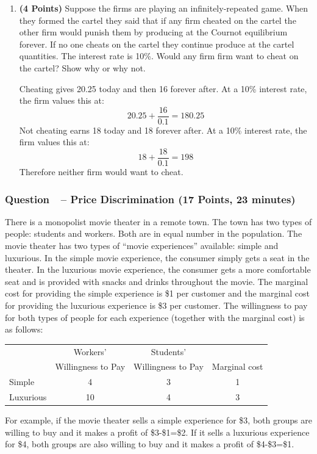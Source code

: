 \documentclass[11pt]{article}
\newcounter{question}[section]
\newcommand{\question}[1]{\refstepcounter{question}
  \subsubsection*{Question~\thequestion~-- #1}}
\newenvironment{subquestions}{
  \begin{enumerate}[label=(\roman*)]}{\end{enumerate}}
\begin{document}
\begin{subquestions}
    \textcolor{solution-color}{
      If firm 2 is producing $q_2=3$, if firm 1 wants to cheat it will produce on its reaction function: $q_1=6-\frac{1}{2}q_2=6-\frac{1}{2}\times3=4.5$.
      If it does this the new price is $p=12-4.5-3=4.5$. Therefore profits are $4.5\times 4.5 = 20.25$.
    }
  \item \textbf{(4 Points)} Suppose the firms are playing an infinitely-repeated game. When they formed the cartel they said that if any firm cheated on the cartel the other firm would punish them by producing at the Cournot equilibrium forever. If no one cheats on the cartel they continue produce at the cartel quantities. The interest rate is 10\%. Would any firm firm want to cheat on the cartel? Show why or why not.

    \textcolor{solution-color}{
      Cheating gives 20.25 today and then 16 forever after. At a 10\% interest rate, the firm values this at:
      \[
        20.25 + \frac{16}{0.1}=180.25
      \]
      Not cheating earns 18 today and 18 forever after. At a 10\% interest rate, the firm values this at:
      \[
        18+\frac{18}{0.1}=198
      \]
      Therefore neither firm would want to cheat.
    }
\end{subquestions}

\question{Price Discrimination (17 Points, 23 minutes)}
There is a monopolist movie theater in a remote town. The town has two types of people: students and workers. Both are in equal number in the population. The movie theater has two types of ``movie experiences'' available: simple and luxurious. In the simple movie experience, the consumer simply gets a seat in the theater. In the luxurious movie experience, the consumer gets a more comfortable seat and is provided with snacks and drinks throughout the movie. The marginal cost for providing the simple experience is \$1 per customer and the marginal cost for providing the luxurious experience is \$3 per customer. The willingness to pay for both types of people for each experience (together with the marginal cost) is as follows:

\begin{center}
  \begin{tabular}{l|cc|c|}\hline\hline
    & Workers' & Students' &\\
    & Willingness to Pay & Willingness to Pay & Marginal cost\\ \hline
    Simple & 4 & 3 & 1 \\
    Luxurious & 10 & 4 & 3 \\ \hline\hline
  \end{tabular}
\end{center}
For example, if the movie theater sells a simple experience for \$3, both groups are willing to buy and it makes a profit of \$3-\$1=\$2. If it sells a luxurious experience for \$4, both groups are also willing to buy and it makes a profit of \$4-\$3=\$1.
\end{document}
